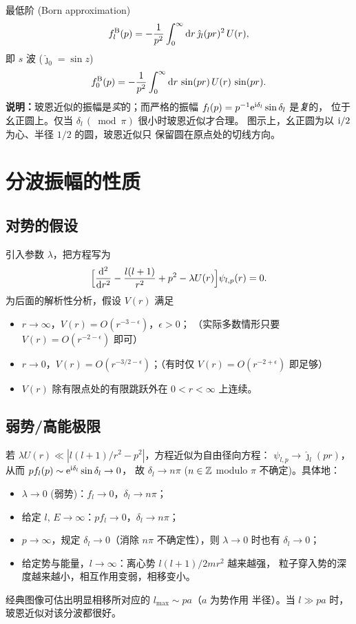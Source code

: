 最低阶 (Born approximation)
\begin{equation}\label{eq:fl-ch10-Born}
f_l^{\rm B}(p)=-\frac{1}{p^2}\int_0^\infty \mathrm{d} r\,\hat\jmath_l(pr)^2\,U(r),
\end{equation}
即 $s$ 波 ($\hat\jmath_0=\sin z$)
\[
f_0^{\rm B}(p)=-\frac{1}{p^2}\int_0^\infty \mathrm{d} r\,\sin(pr)\,U(r)\,\sin(pr).
\]
\textbf{说明：}玻恩近似的振幅是\emph{实}的；而严格的振幅
$f_l(p)=p^{-1}\mathrm{e}^{\mathrm{i}\delta_l}\sin\delta_l$ 是\emph{复}的，
位于幺正圆上。仅当 $\delta_l\,(\bmod\pi)$ 很小时玻恩近似才合理。
图示上，幺正圆为以 $\mathrm{i}/2$ 为心、半径 $1/2$ 的圆，玻恩近似只
保留圆在原点处的切线方向。

\section{分波振幅的性质}\label{sec:pw-properties}

\subsection{对势的假设}

引入参数 $\lambda$，把方程写为
\begin{equation}\label{eq:radial-lambda}
\Bigl[\frac{\mathrm{d}^2}{\mathrm{d} r^2}-\frac{l(l+1)}{r^2}+p^2-\lambda U(r)\Bigr]\psi_{l,p}(r)=0.
\end{equation}
为后面的解析性分析，假设 $V(r)$ 满足
\begin{itemize}
\item $r\to\infty$，$V(r)=O(r^{-3-\epsilon})$，$\epsilon>0$；
（实际多数情形只要 $V(r)=O(r^{-2-\epsilon})$ 即可）
\item $r\to 0$，$V(r)=O(r^{-3/2-\epsilon})$；（有时仅
  $V(r)=O(r^{-2+\epsilon})$ 即足够）
\item $V(r)$ 除有限点处的有限跳跃外在 $0<r<\infty$ 上连续。
\end{itemize}

\subsection{弱势/高能极限}

若 $\lambda U(r)\ll |l(l+1)/r^2-p^2|$，方程近似为自由径向方程：
$\psi_{l,p}\to\hat\jmath_l(pr)$，从而 $pf_l(p)\sim\mathrm{e}^{\mathrm{i}\delta_l}\sin\delta_l\to0$，
故 $\delta_l\to n\pi$ ($n\in\mathbb{Z}$ modulo $\pi$ 不确定)。具体地：
\begin{itemize}
\item $\lambda\to0$ (弱势)：$f_l\to0$，$\delta_l\to n\pi$；
\item 给定 $l$, $E\to\infty$：$pf_l\to0$，$\delta_l\to n\pi$；
\item $p\to\infty$，规定 $\delta_l\to0$（消除 $n\pi$ 不确定性），则
  $\lambda\to0$ 时也有 $\delta_l\to 0$；
\item 给定势与能量，$l\to\infty$：离心势 $l(l+1)/2mr^2$ 越来越强，
  粒子穿入势的深度越来越小，相互作用变弱，相移变小。
\end{itemize}
经典图像可估出明显相移所对应的 $l_{\max}\sim pa$（$a$ 为势作用
半径）。当 $l\gg pa$ 时，玻恩近似对该分波都很好。

